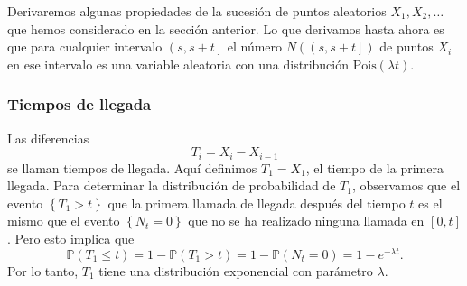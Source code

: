 	Derivaremos algunas propiedades de la sucesión de puntos aleatorios $X_{1},X_{2},\ldots$ que hemos considerado en la sección anterior. Lo que derivamos hasta ahora es que para cualquier intervalo $\left(s,s+t\right]$ el número $N\left(\left(s,s+t\right]\right)$ de puntos $X_{i}$ en ese intervalo es una variable aleatoria con una distribución $\mathrm{Pois}\left(\lambda t\right)$.

\subsubsection{Tiempos de llegada}

	Las diferencias
	\[
		T_{i}=X_{i}-X_{i-1}
	\]
	se llaman tiempos de llegada. Aquí definimos $T_{1}=X_{1}$, el tiempo de la primera llegada. Para determinar la distribución de probabilidad de $T_{1}$, observamos que el evento $\left\{T_{1}>t\right\}$ que la primera llamada de llegada después del tiempo $t$ es el mismo que el evento $\left\{N_{t}=0\right\}$ que no se ha realizado ninguna llamada en $\left[0,t\right]$. Pero esto implica que
	\[
		\mathds{P}\left(T_{1}\le t\right)=1-\mathds{P}\left(T_{1}>t\right)=1-\mathds{P}\left(N_{t}=0\right)=1-e^{-\lambda t}.
	\]
	Por lo tanto, $T_{1}$ tiene una distribución exponencial con parámetro $\lambda$.

